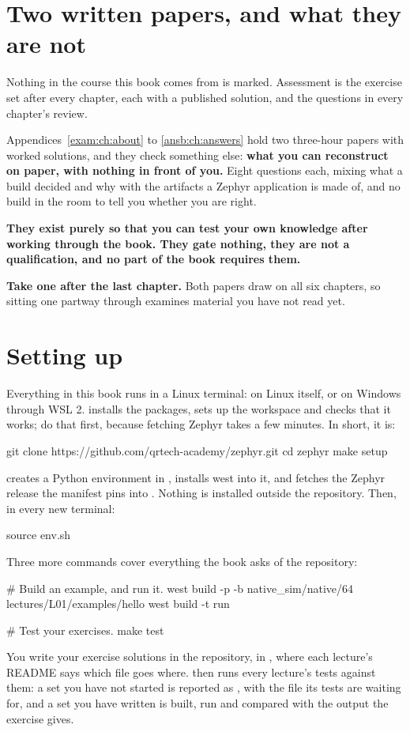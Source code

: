 \section*{Two written papers, and what they are not}
Nothing in the course this book comes from is marked. Assessment is the exercise set after every
chapter, each with a published solution, and the questions in every chapter's review.

Appendices~\ref{exam:ch:about} to \ref{ansb:ch:answers} hold two three-hour papers with worked
solutions, and they check something else: \textbf{what you can reconstruct on paper, with nothing
in front of you.} Eight questions each, mixing what a build decided and why with the artifacts a
Zephyr application is made of, and no build in the room to tell you whether you are right.

\textbf{They exist purely so that you can test your own knowledge after working through the book.
They gate nothing, they are not a qualification, and no part of the book requires them.}

\textbf{Take one after the last chapter.} Both papers draw on all six chapters, so sitting one
partway through examines material you have not read yet.

\section*{Setting up}
Everything in this book runs in a Linux terminal: on Linux itself, or on Windows through WSL 2.
 installs the packages, sets up the workspace and checks that it works; do that
first, because fetching Zephyr takes a few minutes. In short, it is:

\begin{shell}
git clone https://github.com/qrtech-academy/zephyr.git
cd zephyr
make setup
\end{shell}

\noindent{} creates a Python environment in , installs west into it, and
fetches the Zephyr release the manifest pins into . Nothing is installed outside the
repository. Then, in every new terminal:

\begin{shell}
source env.sh
\end{shell}

\noindent Three more commands cover everything the book asks of the repository:

\begin{shell}
# Build an example, and run it.
west build -p -b native_sim/native/64 lectures/L01/examples/hello
west build -t run

# Test your exercises.
make test
\end{shell}

\noindent You write your exercise solutions in the repository, in ,
where each lecture's README says which file goes where.  then runs every lecture's
tests against them: a set you have not started is reported as , with the file its tests
are waiting for, and a set you have written is built, run and compared with the output the exercise
gives.

